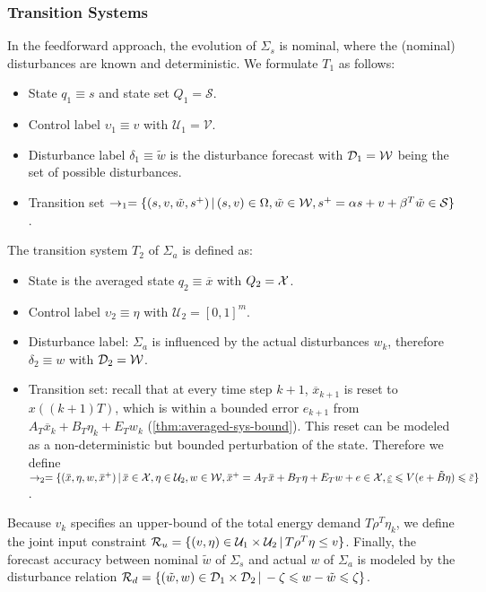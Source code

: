 \subsubsection{Transition Systems}
\label{sec:abstraction-gs:feedforward:Ts}

In the feedforward approach, the evolution of $\Sigma_{s}$ is nominal, where the (nominal) disturbances are known and deterministic.
We formulate $T_{1}$ as follows:
\begin{itemize}
\item State $q_{1} \equiv s$ and state set $Q_{1} = \mathcal{S}$.
\item Control label $\upsilon_{1} \equiv v$ with $\mathcal{U}_{1} = \mathcal{V}$.
\item Disturbance label $\delta_{1} \equiv \tilde{w}$ is the disturbance forecast with $\mathcal{D}_{1} = \mathcal{W}$ being the set of possible disturbances.
\item Transition set $\rightarrow_{1} = \{ (s, v, \tilde{w}, s^{+}) \,|\, (s,v) \in \Omega,\allowbreak \tilde{w} \in \WSet, %
  \allowbreak s^{+} = \alpha s + v + \beta^{T} \tilde{w} \in \SSet\}$. %
\end{itemize}
%
The transition system $T_{2}$ of $\Sigma_{a}$ is defined as:
\begin{itemize}
\item State is the averaged state $q_{2} \equiv \overbar{x}$ with $Q_{2} = \mathcal{X}$.
\item Control label $\upsilon_{2} \equiv \eta$ with $\mathcal{U}_{2} = [0,1]^{m}$.
\item Disturbance label: $\Sigma_{a}$ %
  is influenced by the actual disturbances $w_{k}$, therefore $\delta_{2} \equiv w$ with $\mathcal{D}_{2} = \mathcal{W}$.
\item Transition set: recall that at every time step $k+1$, $\overbar{x}_{k+1}$ is reset to $x((k+1)T)$, which is within a bounded error $e_{k+1}$ from $A_{T} \overbar{x}_{k} + B_{T} \eta_k + E_{T} w_{k}$ (\cf \cref{thm:averaged-sys-bound}).  This reset can be modeled as a non-deterministic but bounded perturbation of the state.  Therefore we define $\rightarrow_{2} = \{ (\overbar{x}, \eta, w, \overbar{x}^{+}) \,|\, \overbar{x} \in \XSet, \eta \in \mathcal{U}_{2}, w \in \WSet,\allowbreak \overbar{x}^{+} = A_{T} \overbar{x}+ B_{T} \eta + E_{T} w + e \in \XSet,\allowbreak 
\underline{\varepsilon} \leqslant V (e + \tilde{B} \eta) \leqslant \overbar{\varepsilon}\}$.
\end{itemize}
%
Because $v_{k}$ specifies an upper-bound of the total energy demand $T \rho^{T} \eta_{k}$, we define the joint input constraint $\mathcal{R}_{u} = \{ (v, \eta) \in \mathcal{U}_{1} \times \mathcal{U}_{2} \,|\, T \rho^{T} \eta \leq v \}$.
Finally, the forecast accuracy between nominal $\tilde{w}$ of $\Sigma_{s}$ and actual $w$ of $\Sigma_{a}$ is modeled by the disturbance relation $\mathcal{R}_{d} = \{ (\tilde{w}, w) \in \mathcal{D}_{1} \times \mathcal{D}_{2} \,|\, -\zeta \leqslant w - \tilde{w} \leqslant \zeta \}$.


